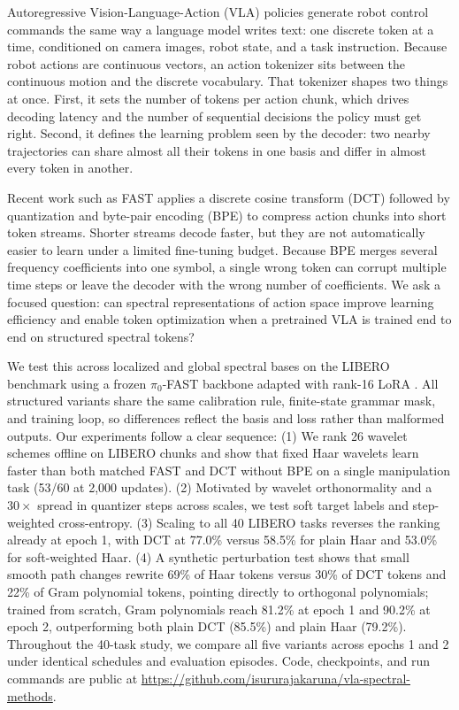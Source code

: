 \documentclass[10pt]{article}
\makeatletter
\renewcommand\section{\@startsection{section}{1}{0pt}{-9pt plus -2pt minus -1pt}{3pt plus 1pt}{\large\bfseries}}
\makeatother
\begin{document}
\section{Introduction}
\label{sec:intro}

Autoregressive Vision-Language-Action (VLA) policies generate robot control commands the same way a language model writes text: one discrete token at a time, conditioned on camera images, robot state, and a task instruction.
Because robot actions are continuous vectors, an action tokenizer sits between the continuous motion and the discrete vocabulary.
That tokenizer shapes two things at once.
First, it sets the number of tokens per action chunk, which drives decoding latency and the number of sequential decisions the policy must get right.
Second, it defines the learning problem seen by the decoder: two nearby trajectories can share almost all their tokens in one basis and differ in almost every token in another.

Recent work such as FAST \citep{pertsch2025fast} applies a discrete cosine transform (DCT) followed by quantization and byte-pair encoding (BPE) to compress action chunks into short token streams.
Shorter streams decode faster, but they are not automatically easier to learn under a limited fine-tuning budget.
Because BPE merges several frequency coefficients into one symbol, a single wrong token can corrupt multiple time steps or leave the decoder with the wrong number of coefficients.
We ask a focused question: can spectral representations of action space improve learning efficiency and enable token optimization when a pretrained VLA is trained end to end on structured spectral tokens?

We test this across localized and global spectral bases on the LIBERO benchmark \citep{liu2023libero} using a frozen $\pi_0$-FAST backbone adapted with rank-16 LoRA \citep{hu2022lora}.
All structured variants share the same calibration rule, finite-state grammar mask, and training loop, so differences reflect the basis and loss rather than malformed outputs.
Our experiments follow a clear sequence:
(1) We rank 26 wavelet schemes offline on LIBERO chunks and show that fixed Haar wavelets learn faster than both matched FAST and DCT without BPE on a single manipulation task (53/60 at 2,000 updates).
(2) Motivated by wavelet orthonormality and a $30\times$ spread in quantizer steps across scales, we test soft target labels and step-weighted cross-entropy.
(3) Scaling to all 40 LIBERO tasks reverses the ranking already at epoch 1, with DCT at 77.0\% versus 58.5\% for plain Haar and 53.0\% for soft-weighted Haar.
(4) A synthetic perturbation test shows that small smooth path changes rewrite 69\% of Haar tokens versus 30\% of DCT tokens and 22\% of Gram polynomial tokens, pointing directly to orthogonal polynomials; trained from scratch, Gram polynomials reach 81.2\% at epoch 1 and 90.2\% at epoch 2, outperforming both plain DCT (85.5\%) and plain Haar (79.2\%).
Throughout the 40-task study, we compare all five variants across epochs 1 and 2 under identical schedules and evaluation episodes.
Code, checkpoints, and run commands are public at \url{https://github.com/isururajakaruna/vla-spectral-methods}.
\end{document}
